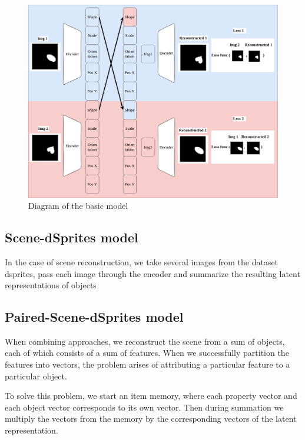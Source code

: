 \documentclass{article}
\begin{document}
    \begin{figure}[ht]
        \centering
        \includegraphics[width=\linewidth]{img/model/paired_dsprites_model}
        \caption{Diagram of the basic model}
        \label{fig:paired_dsprites_model}

    \end{figure}

    \subsection{Scene-dSprites model}

    In the case of scene reconstruction, we take several images from the dataset
    dsprites, pass each image through the encoder and summarize the resulting
    latent representations of objects

    \subsection{Paired-Scene-dSprites model}
    When combining approaches, we reconstruct the scene from a sum of objects,
    each of which consists of a sum of features. When we successfully partition
    the features into vectors, the problem arises of attributing a particular
    feature to a particular object.

    To solve this problem, we start an item memory, where each property vector
    and each object vector corresponds to its own vector.
    Then during summation we multiply the vectors from the memory by the corresponding
    vectors of the latent representation.
\end{document}
